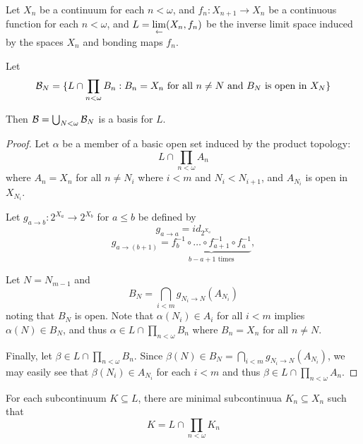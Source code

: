  



Let $X_n$ be a continuum for each $n<\omega$, and $f_n:X_{n+1}\to X_n$ be a continuous function for each $n<\omega$, and $\displaystyle L=\lim_{\leftarrow}(X_n,f_n)$ be the inverse limit space induced by the spaces $X_n$ and bonding maps $f_n$.

\begin{lemma}\label{basis}
  Let 
    \[
      \mathcal{B}_N = 
      \{L\cap \prod_{n<\omega} B_n : B_n=X_n \text{ for all } n\not= N \text{ and } B_N \text{ is open in } X_N\}
    \]

  Then $\mathcal{B} = \bigcup_{N<\omega} \mathcal{B}_N$ is a basis for $L$.
\end{lemma}

\begin{proof}
  Let $\alpha$ be a member of a basic open set induced by the product topology:
    \[
      L \cap \prod_{n<\omega} A_n
    \]
  where $A_n=X_n$ for all $n\not=N_i$ where $i<m$ and $N_i<N_{i+1}$, and $A_{N_i}$ is open in $X_{N_i}$.

  Let $g_{a\to b}: 2^{X_a}\to 2^{X_b}$ for $a\leq b$ be defined by
  \[
    g_{a\to a} = id_{2^{X_a}}
  \]
  \[
    g_{a\to (b+1)} =
    \underbrace{ f^{-1}_{b} \circ \dots \circ f^{-1}_{a+1} \circ f^{-1}_a}_{b-a+1 \text{ times}},
  \]

  Let $N=N_{m-1}$ and
    \[
      B_N = \bigcap_{i<m} g_{N_i\to N} (A_{N_i})
    \]
  noting that $B_N$ is open. Note that $\alpha(N_i)\in A_i$ for all $i<m$ implies $\alpha(N)\in B_N$, and thus $\alpha\in L \cap \prod_{n<\omega} B_n$ where $B_n=X_n$ for all $n\not=N$.

  Finally, let $\beta\in L \cap \prod_{n<\omega} B_n$. Since $\beta(N)\in B_N = \bigcap_{i<m} g_{N_i\to N} (A_{N_i})$, we may easily see that $\beta(N_i)\in A_{N_i}$ for each $i<m$ and thus $\beta\in L\cap\prod_{n<\omega} A_n$.
\end{proof}

\begin{lemma}\label{subcontinuua}
  For each subcontinuum $K\subseteq L$, there are minimal subcontinuua $K_n\subseteq X_n$ such that
    \[
      K = L \cap \prod_{n<\omega} K_n
    \]
\end{lemma}

